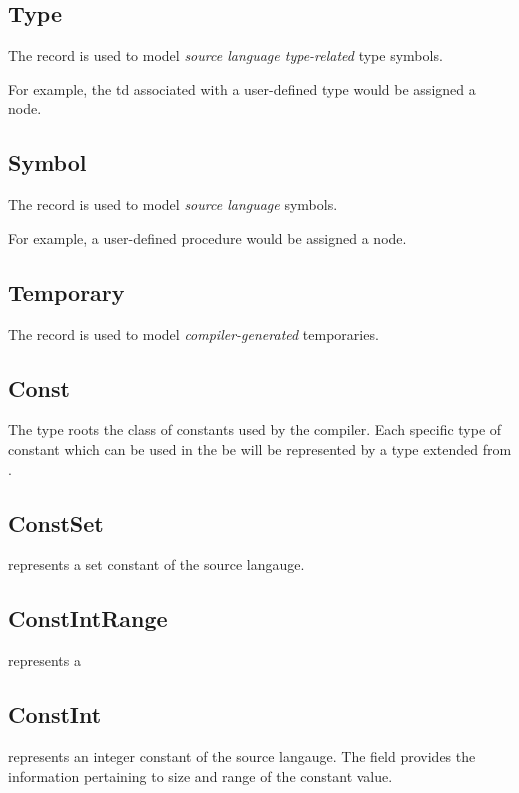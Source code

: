 \subsection{Type}

The  record is used to model \emph{source language
  type-related} type symbols.

For example, the \ac{td} associated with a user-defined type would be
assigned a  node.

\subsection{Symbol}
The  record is used to model \emph{source language}
symbols.

For example, a user-defined procedure would be assigned a
 node.

\subsection{Temporary}
The  record is used to model \emph{compiler-generated}
temporaries.

\subsection{Const}

The  type roots the class of constants used by the
compiler.  Each specific type of constant which can be used in the
\ac{be} will be represented by a type extended from .

\subsection{ConstSet}

 represents a set constant of the source langauge.

\subsection{ConstIntRange}

 represents a
\subsection{ConstInt}
 represents an integer constant of the source langauge.
The  field provides the information pertaining to size and
range of the constant value.
